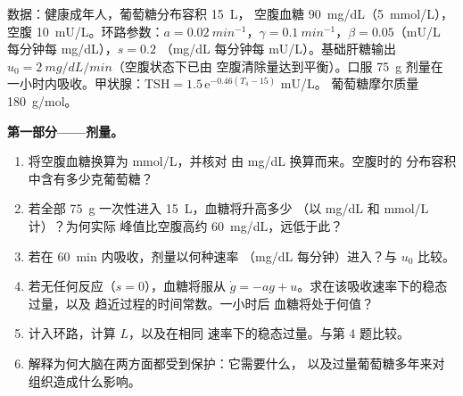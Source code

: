 \begin{problem}
\label{pb:b3:endocrinology:1}
数据：健康成年人，葡萄糖分布容积 \qty{15}{L}，
空腹血糖 \qty{90}{mg/dL}（\qty{5}{mmol/L}），空腹
\qty{10}{mU/L}。环路参数：$a = \qty{0.02}{min^{-1}}$，$\gamma =
\qty{0.1}{min^{-1}}$，$\beta = 0.05$（mU/L 每分钟每 mg/dL），$s = 0.2$
（mg/dL 每分钟每 mU/L）。基础肝糖输出 $u_{0} =
\qty{2}{mg/dL/min}$（空腹状态下已由
空腹清除量达到平衡）。口服 \qty{75}{g} 剂量在
一小时内吸收。甲状腺：$\text{TSH} = 1.5\,\mathrm{e}^{-0.46(T_{4} - 15)}$ mU/L。
葡萄糖摩尔质量 \qty{180}{g/mol}。

\medskip
\noindent\textbf{第一部分——剂量。}
\begin{enumerate}
  \item 将空腹血糖换算为 mmol/L，并核对
        由 mg/dL 换算而来。空腹时的
        分布容积中含有多少克葡萄糖？
  \item 若全部 \qty{75}{g} 一次性进入 \qty{15}{L}，血糖将升高多少
        （以 mg/dL 和 mmol/L 计）？为何实际
        峰值比空腹高约 \qty{60}{mg/dL}，远低于此？
  \item 若在 \qty{60}{min} 内吸收，剂量以何种速率
        （mg/dL 每分钟）进入？与 $u_{0}$ 比较。
  \item 若无任何反应（$s = 0$），血糖将服从 $\dot
        g = -a g + u$。求在该吸收速率下的稳态过量，以及
        趋近过程的时间常数。一小时后
        血糖将处于何值？
  \item 计入环路，计算 $L$，以及在相同
        速率下的稳态过量。与第 4 题比较。
  \item 解释为何大脑在两方面都受到保护：它需要什么，
        以及过量葡萄糖多年来对组织造成什么影响。
\end{enumerate}


\end{problem}
